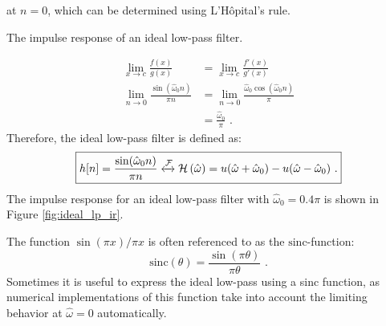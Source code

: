 at $n=0$, which can be determined using L'H\^opital's rule.
\begin{marginfigure}
\begin{center}
\end{center}
\caption{The impulse response of an ideal low-pass filter.}
\label{fig:ideal_lp_ir}
\end{marginfigure}
\begin{align}
\lim_{x\rightarrow c} \frac{f(x)}{g(x)} &= \lim_{x\rightarrow c} \frac{f'(x)}{g'(x)} \\
\lim_{n\rightarrow 0} \frac{\sin(\hat{\omega}_0n)}{\pi n} &= \lim_{n\rightarrow 0} \frac{\hat{\omega}_0\cos(\hat{\omega}_0n)}{\pi}\\
&= \frac{\hat{\omega}_0}{\pi} \,\,.
\end{align}
Therefore, the ideal low-pass filter is defined as:
\begin{equation}
\boxed{
h[n]=\frac{\sin(\hat{\omega}_0 n)}{\pi n}  \xleftrightarrow{\mathcal{F}} \mathcal{H}\left(\hat{\omega}\right) = u(\hat{\omega}+\hat{\omega}_0)-u(\hat{\omega}-\hat{\omega}_0)\,\,.
}
\end{equation}
The impulse response for an ideal low-pass filter with $\hat{\omega}_0
= 0.4\pi$ is shown in Figure \ref{fig:ideal_lp_ir}.

The function $\sin(\pi x)/\pi x$ is often referenced to as the $\mathrm{sinc}$-function:
\begin{equation}
\mathrm{sinc}(\theta) = \frac{\sin(\pi\theta)}{\pi \theta}\,\,.
\end{equation}
Sometimes it is useful to express the ideal low-pass using a sinc
function, as numerical implementations of this function take into
account the limiting behavior at $\hat{\omega}=0$ automatically.


